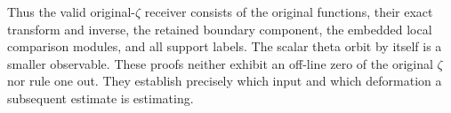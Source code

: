 Thus the valid original-$\zeta$ receiver consists of the original
functions, their exact transform and inverse, the retained boundary
component, the embedded local comparison modules, and all support
labels. The scalar theta orbit by itself is a smaller observable.
These proofs neither exhibit an off-line zero of the original
$\zeta$ nor rule one out. They establish precisely which input and
which deformation a subsequent estimate is estimating.
